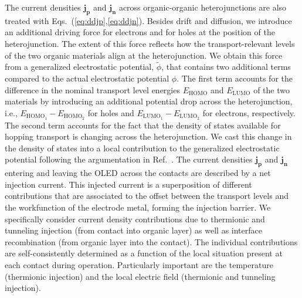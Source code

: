 \documentclass[%
9pt,
 aip,
rsi,%
 amsmath,amssymb,
preprint,%
]{revtex4-1}
\begin{document}
The current densities $\mathbf{j_p}$ and $\mathbf{j_n}$ across organic-organic heterojunctions are also treated with Eqs.~(\ref{eq:ddjp},\ref{eq:ddjn}).
%
Besides drift and diffusion, we introduce an additional driving force for electrons and for holes at the position of the heterojunction. 
The extent of this force reflects how the transport-relevant levels of the two organic materials align at the heterojunction.
We obtain this force from a generalized electrostatic potential, $\tilde{\phi}$, that contains two additional terms compared to the actual electrostatic potential $\phi$. 
The first term accounts for the difference in the nominal transport level energies $E_{\mathrm{HOMO}}$ and $E_{\mathrm{LUMO}}$ of the two materials by introducing an additional potential drop across the heterojunction, i.e., $E_{\mathrm{HOMO}_1}-E_{\mathrm{HOMO}_2}$ for holes and $E_{\mathrm{LUMO}_1}-E_{\mathrm{LUMO}_2}$ for electrons, respectively.\cite{Sutherland}
The second term accounts for the fact that the density of states available for hopping transport is changing across the heterojunction.
We cast this change in the density of states into a local contribution to the generalized electrostatic potential following the argumentation in Ref.~\cite{Liemant}.
The current densities $\mathbf{j_p}$ and $\mathbf{j_n}$ entering and leaving the OLED across the contacts are described by a net injection current.
This injected current is a superposition of different contributions that are associated to the offset between the transport levels and the workfunction of the electrode metal, forming the injection barrier. We specifically consider current density contributions due to thermionic and tunneling injection (from contact into organic layer) as well as interface recombination (from organic layer into the contact).\cite{Davids1998a,Gruber2012,Scott1999}
The individual contributions are self-consistently determined as a function of the local situation present at each contact during operation. Particularly important are the temperature (thermionic injection) and the local electric field (thermionic and tunneling injection). 
\end{document}
